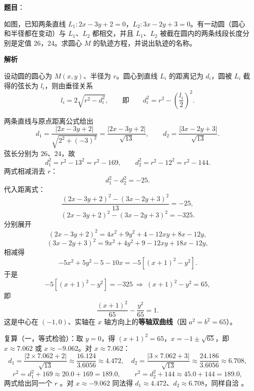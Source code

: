 \begin{answer}

\textbf{题目}：

如图，已知两条直线 $L_1:2x-3y+2=0$，$L_2:3x-2y+3=0$。有一动圆（圆心和半径都在变动）与 $L_1$、$L_2$ 都相交，并且 $L_1$、$L_2$ 被截在圆内的两条线段长度分别是定值 26，24。求圆心 $M$ 的轨迹方程，并说出轨迹的名称。
\nopagebreak[4]
\begin{center}\end{center}
\nopagebreak[4]
\textbf{解析}
\nopagebreak[4]
\begin{center}\end{center}
\nopagebreak[4]
设动圆的圆心为 $M(x,y)$、半径为 $r$。圆心到直线 $L_i$ 的距离记为 $d_i$，圆被 $L_i$ 截得的弦长为 $l_i$，则由垂径关系
\nopagebreak[4]
\[
l_i=2\sqrt{r^2-d_i^2},\qquad\text{即}\qquad d_i^2=r^2-\left(\frac{l_i}{2}\right)^2.
\]

两条直线与原点距离公式给出
\nopagebreak[4]
\[
d_1=\frac{|2x-3y+2|}{\sqrt{2^2+(-3)^2}}=\frac{|2x-3y+2|}{\sqrt{13}},
\qquad
d_2=\frac{|3x-2y+3|}{\sqrt{13}}.
\]
弦长分别为 $26$、$24$，故
\nopagebreak[4]
\[
d_1^2=r^2-13^2=r^2-169,\qquad d_2^2=r^2-12^2=r^2-144.
\]
两式相减消去 $r$：
\nopagebreak[4]
\[
d_1^2-d_2^2=-25.
\]
代入距离式：
\nopagebreak[4]
\[
\frac{(2x-3y+2)^2-(3x-2y+3)^2}{13}=-25,
\]
\nopagebreak[4]
\[
(2x-3y+2)^2-(3x-2y+3)^2=-325.
\]
分别展开
\nopagebreak[4]
\[
(2x-3y+2)^2=4x^2+9y^2+4-12xy+8x-12y,
\]
\nopagebreak[4]
\[
(3x-2y+3)^2=9x^2+4y^2+9-12xy+18x-12y,
\]
相减得
\nopagebreak[4]
\[
-5x^2+5y^2-5-10x=-5\left[(x+1)^2-y^2\right].
\]
于是
\nopagebreak[4]
\[
-5\left[(x+1)^2-y^2\right]=-325\ \Longrightarrow\ (x+1)^2-y^2=65,
\]
即
\nopagebreak[4]
\[
\frac{(x+1)^2}{65}-\frac{y^2}{65}=1.
\]
这是中心在 $(-1,0)$、实轴在 $x$ 轴方向上的\textbf{等轴双曲线}（因 $a^2=b^2=65$）。

复算（一，等式检验）：取 $y=0$，得 $(x+1)^2=65$，$x=-1\pm\sqrt{65}$，即 $x\approx7.062$ 或 $x\approx-9.062$。对 $x\approx7.062$：
\nopagebreak[4]
\[
d_1=\frac{|2\times7.062+2|}{\sqrt{13}}\approx\frac{16.124}{3.6056}\approx4.472,\quad
d_2=\frac{|3\times7.062+3|}{\sqrt{13}}\approx\frac{24.186}{3.6056}\approx6.708,
\]
\nopagebreak[4]
\[
r^2=d_1^2+169\approx20.0+169=189.0,\qquad r^2=d_2^2+144\approx45.0+144=189.0,
\]
两式给出同一个 $r$ 。对 $x\approx-9.062$ 同法得 $d_1\approx4.472$、$d_2\approx6.708$，同样自洽 。


\end{answer}

